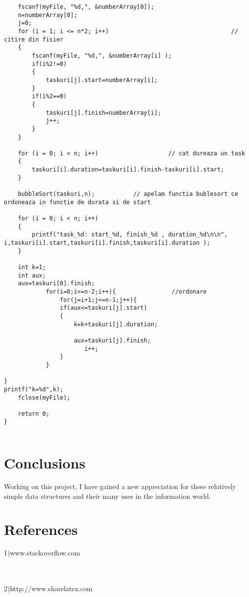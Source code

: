 \documentclass[14pt]{article}
\begin{document}
\begin{lstlisting}
    fscanf(myFile, "%d,", &numberArray[0]);
    n=numberArray[0];
    j=0;
    for (i = 1; i <= n*2; i++)                                   // citire din fisier
    {
        fscanf(myFile, "%d,", &numberArray[i] );
        if(i%2!=0)
        {
            taskuri[j].start=numberArray[i];
        }
        if(i%2==0)
        {
            taskuri[j].finish=numberArray[i];
            j++;
        }
    }

    for (i = 0; i < n; i++)                    // cat dureaza un task
    {
        taskuri[i].duration=taskuri[i].finish-taskuri[i].start;
    }

    bubbleSort(taskuri,n);           // apelam functia bublesort ce ordoneaza in functie de durata si de start

    for (i = 0; i < n; i++)
    {
        printf("task_%d: start_%d, finish_%d , duration_%d\n\n", i,taskuri[i].start,taskuri[i].finish,taskuri[i].duration );
    }

    int k=1;
    int aux;
    aux=taskuri[0].finish;
            for(i=0;i<=n-2;i++){                //ordonare
                for(j=i+1;j<=n-1;j++){
                if(aux<=taskuri[j].start)
                {
                    k=k+taskuri[j].duration;

                    aux=taskuri[j].finish;
                       i++;
                }
            }

}
printf("k=%d",k);
    fclose(myFile);

    return 0;
}


\end{lstlisting}




\newpage
\section*{Conclusions}
\vspace{20 mm}
Working on this project, I have gained a new appreciation for these relatively simple data structures and their many uses in the information world.  
\\\vspace{20mm}
\section*{References}
\large 1)www.stackoverflow.com

\\\vspace{6mm}
\\
2)http://www.sharelatex.com
\end{document}
